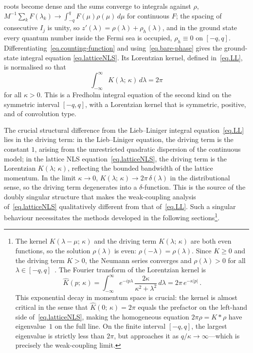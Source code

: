 \documentclass[11pt,a4paper]{article}
\theoremstyle{definition}
\begin{document}
roots become dense and the sums converge to integrals against $\rho$,
$M^{-1}\sum_k F(\lambda_k) \to \int_{-q}^{q}F(\mu)\rho(\mu)\,d\mu$ for
continuous $F$; the spacing of consecutive $I_j$ is unity, so
$z'(\lambda) = \rho(\lambda) + \rho_h(\lambda)$, and in the ground state every
quantum number inside the Fermi sea is occupied, $\rho_h \equiv 0$ on $[-q,q]$.
Differentiating~\eqref{eq.counting-function} and
using~\eqref{eq.bare-phase} gives the ground-state integral equation
\eqref{eq.latticeNLS}.  Its Lorentzian kernel, defined in~\eqref{eq.LL}, is
normalised so that
\begin{equation}\label{eq.K_normalisation}
  \int_{-\infty}^{\infty}K(\lambda;\,\kappa)\,d\lambda = 2\pi
\end{equation}
for all $\kappa > 0$.
This is a Fredholm integral equation of the second kind on the symmetric interval $[-q, q]$, with
a Lorentzian kernel that is symmetric, positive, and of convolution type.

The crucial structural difference from the Lieb--Liniger integral equation~\eqref{eq.LL}
lies in the driving term: in the Lieb--Liniger equation, the driving
term is the constant $1$, arising from the unrestricted quadratic dispersion of the continuous model; in the lattice NLS equation~\eqref{eq.latticeNLS}, the
driving term is the Lorentzian $K(\lambda;\,\kappa)$, reflecting the bounded bandwidth of the lattice momentum.
In the limit $\kappa \to 0$, $K(\lambda;\,\kappa) \to 2\pi\,\delta(\lambda)$ in the distributional sense, so the driving
term degenerates into a $\delta$-function.  This is the source of the
doubly singular structure that makes the weak-coupling analysis
of~\eqref{eq.latticeNLS} qualitatively different from that
of~\eqref{eq.LL}. Such a singular behaviour necessitates the methods developed in the following sections\footnote{
The kernel $K(\lambda - \mu;\,\kappa)$ and the driving term
$K(\lambda;\,\kappa)$ are both even functions, so the
solution $\rho(\lambda)$ is even: $\rho(-\lambda) = \rho(\lambda)$.
Since $K \geq 0$ and the driving term $K > 0$, the Neumann
series converges and $\rho(\lambda) > 0$ for all
$\lambda \in [-q,q]$~\cite{KorepinBogoliubovIzergin1993}.
The Fourier transform of the Lorentzian kernel is
\begin{equation}\label{eq.K-fourier}
  \hat K(p;\,\kappa) = \int_{-\infty}^{\infty}e^{-ip\lambda}\,
  \frac{2\kappa}{\kappa^2 + \lambda^2}\,d\lambda
  = 2\pi\,e^{-\kappa|p|}\,.
\end{equation}
This exponential decay in momentum space is crucial: the kernel is
almost critical in the sense that $\hat K(0;\,\kappa) = 2\pi$
equals the prefactor on the left-hand side
of~\eqref{eq.latticeNLS}, making the homogeneous equation
$2\pi\rho = K * \rho$ have eigenvalue~$1$ on the full line.  On the
finite interval $[-q,q]$, the largest eigenvalue is strictly less
than $2\pi$, but approaches it as $q/\kappa \to \infty$---which is
precisely the weak-coupling limit.}.
 
\end{document}
